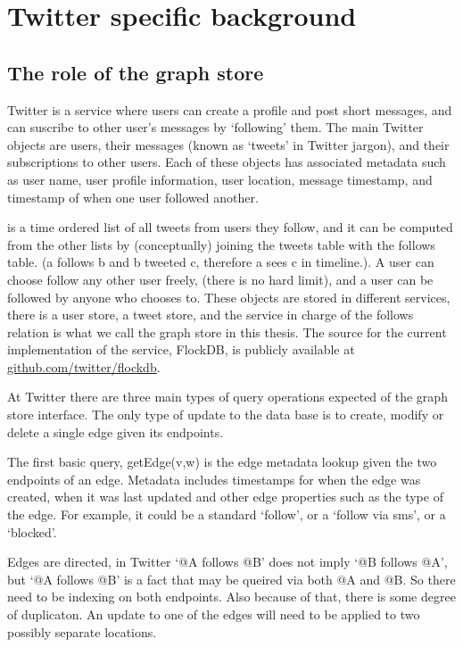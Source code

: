 \chapter{Twitter specific background}
\label{chapter:twitterbackground}

\section{The role of the graph store}
\label{section:api}
Twitter is a service where users can create a profile and post short messages, and can suscribe to other user's messages by `following' them.  The main Twitter objects are users, their  messages  (known as `tweets' in Twitter jargon), and their subscriptions to other users. Each of these objects has associated metadata such as user name, user profile information,  user location,  message timestamp, and timestamp of when one user followed another. 

is  a time ordered list of all tweets from users they follow, and it can be computed from the other lists by (conceptually) joining the tweets table with the follows table. (a follows b and b tweeted c, therefore a sees c in timeline.).  A user can choose follow any other user freely, (there is no hard limit), and a user can be followed by anyone who chooses to.  These objects are stored in different services, there is a user store, a tweet store, and the service in charge of the follows relation is what we call the graph store in this thesis. The source for the current implementation of the service, FlockDB, is publicly available at \hyperlink{https://github.com/twitter/flockdb}{github.com/twitter/flockdb}. 

At Twitter there are three main types of query operations expected of the graph store interface.  The only type of  update to the data base is to create, modify or delete a single edge given its endpoints.

The first basic query, {\code getEdge(v,w)} is the edge metadata lookup given the two endpoints of an edge. Metadata includes  timestamps for when the edge was created, when it was last updated and other edge properties such as the type of the edge. For example, it could be a standard `follow', or a `follow via sms', or a `blocked'.

Edges are directed, in Twitter `@A follows @B' does not imply `@B follows @A', but `@A follows @B' is a fact that may be queired via both @A and @B. So there need to be indexing on both endpoints. Also because of that, there is some degree of duplicaton. An update to one of the edges will need to be applied to two possibly separate locations.

